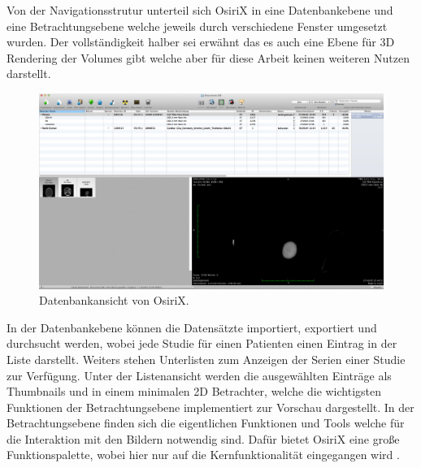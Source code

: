 Von der Navigationsstrutur unterteil sich OsiriX in eine Datenbankebene und eine Betrachtungsebene welche jeweils durch verschiedene Fenster umgesetzt wurden.
Der vollständigkeit halber sei erwähnt das es auch eine Ebene für 3D Rendering der Volumes gibt welche aber für diese Arbeit keinen weiteren Nutzen darstellt.
\begin{figure}[t]
	\centering
	\includegraphics[width=0.8\linewidth]{img/c2_osirix_db_view.jpg}
	\caption{Datenbankansicht von OsiriX.}
\end{figure}
In der Datenbankebene können die Datensätzte importiert, exportiert und durchsucht werden, wobei jede Studie für einen Patienten einen Eintrag in der Liste darstellt.
Weiters stehen Unterlisten zum Anzeigen der Serien einer Studie zur Verfügung.
Unter der Listenansicht werden die ausgewählten Einträge als Thumbnails und in einem minimalen 2D Betrachter,
welche die wichtigsten Funktionen der Betrachtungsebene implementiert zur Vorschau dargestellt.
In der Betrachtungsebene finden sich die eigentlichen Funktionen und Tools welche für die Interaktion mit den Bildern notwendig sind.
Dafür bietet OsiriX eine große Funktionspalette, wobei hier nur auf die Kernfunktionalität eingegangen wird \cite{osirix}.

